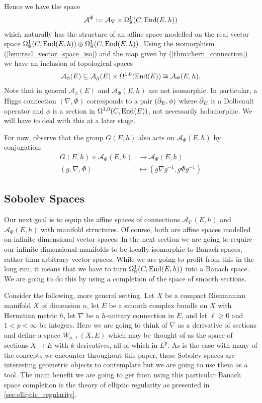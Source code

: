 \documentclass[12pt]{ociamthesis}  %
\begin{document}
Hence we have the space
\begin{align}\label{eq:Higgs_connections_space}
  \mathcal A^{\Phi} := \mathcal A_\nabla \times \Omega^1_{\mathbb{R}}(C,\operatorname{End}(E,h))
\end{align}
which naturally has the structure of an affine space modelled on
the real vector space
$\Omega^1_{\mathbb{R}}(C,\operatorname{End}(E,h))\oplus\Omega_{\mathbb{R}}^1(C,\operatorname{End}(E,h))$. Using the isomorphism (\ref{lem:real_vector_space_iso})
and the map given by (\ref{thm:chern_connection}) we have an inclusion
of topological spaces
\begin{align*}
  \mathcal A_\phi(E) \subseteq \mathcal A_{\bar{\partial}} (E) \times \Omega^{1,0}(\operatorname{End}(E)) \cong \mathcal A_\Phi (E,h).
\end{align*}
Note that in general $\mathcal A_\phi(E)$ and $\mathcal A_\Phi (E,h)$ are not isomorphic. In
particular, a Higgs connection $(\nabla,\Phi)$ corresponds to
a pair $(\bar{\partial}_E,\phi)$ where $\bar{\partial}_E$ is a Dolbeault operator and
$\phi$ is a section in $\Omega^{1,0}(C,\operatorname{End}(E))$, not necessarily
holomorphic. We will have to deal with this at a later stage.

For now, observe that the group $G(E,h)$ also acts on $\mathcal A_\Phi (E,h)$
by conjugation:
\begin{align*}
  G(E,h) \times \mathcal A_\Phi (E,h) & \to \mathcal A_\Phi (E,h)               \\
  (g,\nabla,\Phi)                     & \mapsto (g\nabla{g}^{-1},g\Phi{g}^{-1})
\end{align*}


\subsection{Sobolev Spaces}

Our next goal is to equip the affine spaces of connections $\mathcal A_\nabla(E,h)$
and $\mathcal A_\Phi (E,h)$ with manifold structures. Of course, both are affine
spaces modelled on infinite dimensional vector spaces. In the next
section we are going to require our infinite dimensional manifolds to
be locally isomorphic to Banach spaces, rather than arbitrary
vector spaces. While we are going to profit from this in the long run,
it means that we have to turn $\Omega^1_{\mathbb{R}}(C,\operatorname{End}(E,h))$
into a Banach space. We are going to do this by using a completion of
the space of smooth sections.

Consider the following, more general setting. Let $X$ be a compact
Riemannian manifold $X$ of dimension $n$, let $E$ be a smooth complex
bundle on $X$ with Hermitian metric $h$, let $\nabla$ be a $h$-unitary
connection in $E$, and let $\ell\geq 0$ and $1<p<\infty$ be integers.
Here we are going to think of $\nabla$ as a derivative of sections and
define a space $W_{p,\ell}(X,E)$ which may be thought of as the space of
sections $X\to E$ with $k$ derivatives, all of which in $L^p$. As
is the case with many of the concepts we encounter throughout this paper,
these Sobolev spaces are interesting geometric objects to
contemplate but we are going to use them as a tool. The main
benefit we are going to get from using this particular Banach space
completion is the theory of elliptic regularity as presented in
\ref{sec:elliptic_regularity}.
\end{document}
